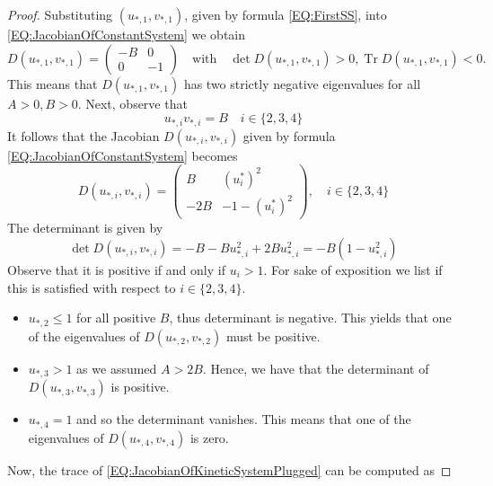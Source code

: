 \documentclass[12pt, a4paper]{article}
\theoremstyle{break}
\theoremstyle{break}
\theoremstyle{break}
\theoremstyle{break}
\theoremstyle{break}
\theoremstyle{break}
\theoremstyle{break}
\DeclareMathOperator{\Tr}{Tr}
\begin{document}
\begin{proof}
    Substituting  $(u_{*,1}, v_{*,1})$, given by formula \eqref{EQ:FirstSS}, into \eqref{EQ:JacobianOfConstantSystem} we obtain
    \begin{equation*}
        D(u_{*,1}, v_{*,1}) = \begin{pmatrix}
            - B & 0 \\ 0 & -1
        \end{pmatrix} \quad \text{with} \quad \det D(u_{*,1}, v_{*,1}) > 0, \Tr D(u_{*,1}, v_{*,1}) < 0.
    \end{equation*}
    This means that $D(u_{*,1}, v_{*,1})$ has two strictly negative eigenvalues for all $A > 0, B > 0$. Next, observe that 
    \begin{equation*}
        u_{*,i} v_{*,i} = B \quad i \in \{2, 3, 4\}
    \end{equation*}
    It follows that the Jacobian $D(u_{*,i}, v_{*,i})$ given by formula \eqref{EQ:JacobianOfConstantSystem} becomes
    \begin{equation}
        \label{EQ:JacobianOfKineticSystemPlugged}
        D(u_{*,i}, v_{*,i}) = \begin{pmatrix}
            B & (u^*_i)^2 \\ -2B & -1 - (u^*_i)^2
        \end{pmatrix},
        \quad i \in \{2, 3, 4\}
    \end{equation}
    The determinant is given by
    \begin{equation}
        \label{EQ:DeterminantLinearizationKinetic}
        \det D(u_{*,i}, v_{*,i}) = -B -Bu_{*,i}^2 + 2Bu_{*,i}^2 = -B(1-u_{*, i}^2)
    \end{equation}
    Observe that it is positive if and only if $u_i > 1$. For sake of exposition we list if this is satisfied with respect to $i \in \{2, 3, 4\}$.
    \begin{itemize}
        \item $u_{*,2} \leq 1$ for all positive $B$, thus determinant is negative. This yields that one of the eigenvalues of $D(u_{*,2}, v_{*,2})$ must be positive.
        \item $u_{*,3} > 1$ as we assumed $A > 2B$. Hence, we have that the determinant of $D(u_{*,3}, v_{*,3})$ is positive.
        \item $u_{*,4} = 1$ and so the determinant vanishes. This means that one of the eigenvalues of $D(u_{*,4}, v_{*,4})$ is zero.
    \end{itemize}
    Now, the trace of \eqref{EQ:JacobianOfKineticSystemPlugged} can be computed as

\end{proof}
\end{document}
